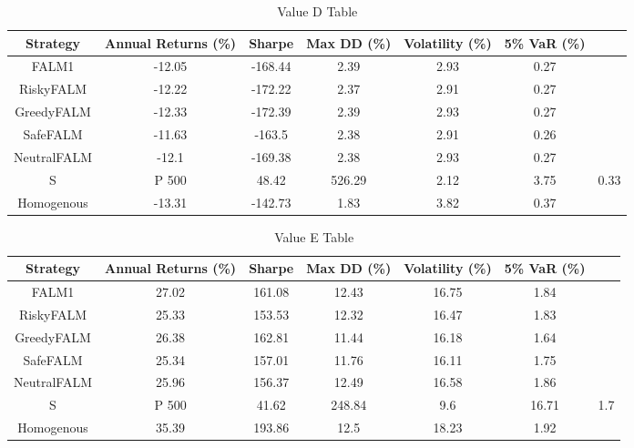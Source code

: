 \begin{table}[]
    \centering
    \caption{Value D Table}
    \begin{tabular}{|c|c|c|c|c|c|c|}
        \hline
        Strategy & Annual Returns (\%) & Sharpe & Max \ac{DD} (\%) & Volatility (\%)& 5\% \ac{VaR} (\%) \\
        \hline
        FALM1 & -12.05 & -168.44 & 2.39 & 2.93 & 0.27 \\
        RiskyFALM & -12.22 & -172.22 & 2.37 & 2.91 & 0.27 \\
        GreedyFALM & -12.33 & -172.39 & 2.39 & 2.93 & 0.27 \\
        SafeFALM & -11.63 & -163.5 & 2.38 & 2.91 & 0.26 \\
        NeutralFALM & -12.1 & -169.38 & 2.38 & 2.93 & 0.27 \\
        S&P 500 & 48.42 & 526.29 & 2.12 & 3.75 & 0.33 \\
        Homogenous & -13.31 & -142.73 & 1.83 & 3.82 & 0.37 \\
        \hline
    \end{tabular}
    \label{tab:value_d_table}
\end{table}

\begin{table}[]
    \centering
    \caption{Value E Table}
    \begin{tabular}{|c|c|c|c|c|c|c|}
        \hline
        Strategy & Annual Returns (\%) & Sharpe & Max \ac{DD} (\%) & Volatility (\%)& 5\% \ac{VaR} (\%) \\
        \hline
        FALM1 & 27.02 & 161.08 & 12.43 & 16.75 & 1.84 \\
        RiskyFALM & 25.33 & 153.53 & 12.32 & 16.47 & 1.83 \\
        GreedyFALM & 26.38 & 162.81 & 11.44 & 16.18 & 1.64 \\
        SafeFALM & 25.34 & 157.01 & 11.76 & 16.11 & 1.75 \\
        NeutralFALM & 25.96 & 156.37 & 12.49 & 16.58 & 1.86 \\
        S&P 500 & 41.62 & 248.84 & 9.6 & 16.71 & 1.7 \\
        Homogenous & 35.39 & 193.86 & 12.5 & 18.23 & 1.92 \\
        \hline
    \end{tabular}
    \label{tab:value_e_table}
\end{table}

